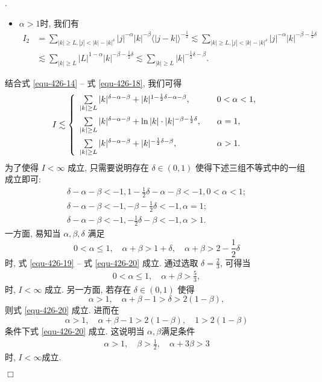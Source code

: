 \documentclass[master]{cugthesis}
\newenvironment{proof}{{\noindent\itshape 证明}.}{\hfill $\Box$\par}
\begin{document}
\begin{proof}
\begin{itemize}
       \item $\alpha>1$时, 我们有
    \begin{align}\label{equ-426-18}
          I_2&= \sum_{|k|\ge L,|j|<|k|-|k|^\delta}|j|^{-\alpha}|k|^{-\beta}\langle |j-k|\rangle^{-\frac{1}{2}}\lesssim \sum_{|k|\ge L,|j|<|k|-|k|^{\delta}}|j|^{-\alpha}|k|^{-\beta-\frac{1}{2}\delta}\nonumber\\
          &\lesssim \sum_{|k|\ge L }|L|^{1-\alpha}|k|^{-\beta-\frac{1}{2}\delta}\lesssim\sum_{|k|\ge L}|k|^{-\frac{1}{2}\delta-\beta}.
    \end{align}
     \end{itemize}
结合式 \eqref{equ-426-14} -- 式 \eqref{equ-426-18}, 我们可得
\begin{align*}
I\lesssim
\left\{
\begin{array}{ll}
\sum_{|k|\geq L}\limits|k|^{\delta-\alpha-\beta}+ |k|^{1-\frac{1}{2}\delta-\alpha-\beta}, &  \quad 0<\alpha<1,\vspace{1ex}\\
\sum_{|k|\geq L}\limits|k|^{\delta-\alpha-\beta}+ \ln|k|\cdot|k|^{-\beta-\frac{1}{2}\delta}, & \quad \alpha=1,\vspace{1ex}\\
\sum_{|k|\geq L}\limits|k|^{\delta-\alpha-\beta}+|k|^{-\frac{1}{2}\delta-\beta}, & \quad \alpha>1.
\end{array}
\right.
\end{align*}
为了使得 $I<\infty$ 成立, 只需要说明存在 $\delta\in(0,1)$ 使得下述三组不等式中的一组成立即可:
\begin{align}
\delta-\alpha-\beta<-1, 1-\frac{1}{2}\delta-\alpha-\beta<-1,0<\alpha<1; \label{equ-426-19}\\
\delta-\alpha-\beta<-1,-\beta-\frac{1}{2}\delta<-1,\alpha=1; \label{equ-426-20}\\
\delta-\alpha-\beta<-1, -\frac{1}{2}\delta-\beta<-1, \alpha>1. \label{equ-426-21}
\end{align}
一方面, 易知当 $\alpha,\beta,\delta$ 满足
$$
0<\alpha\leq 1, \quad \alpha+\beta>1+\delta, \quad \alpha+\beta>2-\frac{1}{2}\delta
$$
时, 式 \eqref{equ-426-19} -- 式 \eqref{equ-426-20} 成立. 
通过选取 $\delta=\frac{2}{3}$, 可得当
\begin{align} \label{equ-426-22}
0<\alpha\leq 1, \quad \alpha+\beta>\frac{5}{3},
\end{align}时, $I<\infty$ 成立.
另一方面, 若存在 $\delta\in(0,1)$ 使得
$$
\alpha>1, \quad \alpha+\beta-1>\delta>2(1-\beta),
$$
则式 \eqref{equ-426-20} 成立.
进而在
$$
\alpha>1, \quad \alpha+\beta-1>2(1-\beta), \quad 1>2(1-\beta)
$$
条件下式 \eqref{equ-426-20} 成立.
 这说明当 $\alpha,\beta$满足条件
\begin{align} \label{equ-426-23}
\alpha>1, \quad \beta>\frac{1}{2}, \quad \alpha+3\beta>3
\end{align}
时, $I<\infty$成立.


\end{proof}
\end{document}
